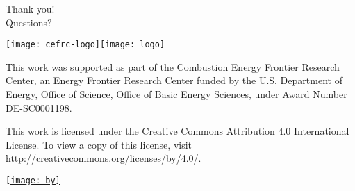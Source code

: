 \documentclass{beamer}
\begin{document}
\begin{frame}[plain]
Thank you!\\
Questions?

\vspace{1cm}

\texttt{[image: cefrc-logo]}\texttt{[image: logo]}

This work was supported as part of the Combustion Energy Frontier Research Center,
an Energy Frontier Research Center funded by the U.S. Department of Energy, Office
of Science, Office of Basic Energy Sciences, under Award Number DE-SC0001198.
\end{frame}

\begin{frame}[plain]
\vspace{\fill}
\begin{center}
    This work is licensed under the Creative Commons Attribution 4.0
    International License. To view a copy of this license, visit
    \url{http://creativecommons.org/licenses/by/4.0/}.

    \vspace{0.1in}

    \href{https://creativecommons.org/licenses/by/4.0/}{\texttt{[image: by]}}
\end{center}
\vspace{\fill}
\end{frame}
\end{document}

